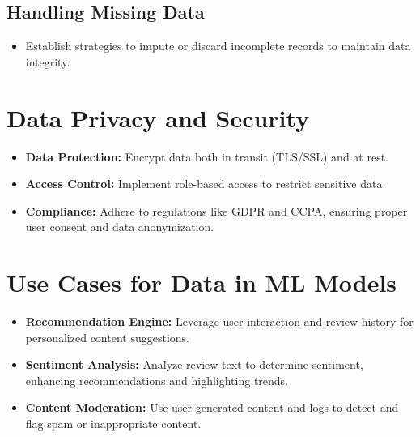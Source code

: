 \documentclass[11pt]{article}
\begin{document}
\subsection*{Handling Missing Data}
\begin{itemize}[noitemsep]
    \item Establish strategies to impute or discard incomplete records to maintain data integrity.
\end{itemize}

\section{Data Privacy and Security}
\begin{itemize}[noitemsep]
    \item \textbf{Data Protection:} Encrypt data both in transit (TLS/SSL) and at rest.
    \item \textbf{Access Control:} Implement role-based access to restrict sensitive data.
    \item \textbf{Compliance:} Adhere to regulations like GDPR and CCPA, ensuring proper user consent and data anonymization.
\end{itemize}

\section{Use Cases for Data in ML Models}
\begin{itemize}[noitemsep]
    \item \textbf{Recommendation Engine:} Leverage user interaction and review history for personalized content suggestions.
    \item \textbf{Sentiment Analysis:} Analyze review text to determine sentiment, enhancing recommendations and highlighting trends.
    \item \textbf{Content Moderation:} Use user-generated content and logs to detect and flag spam or inappropriate content.
\end{itemize}
\end{document}
